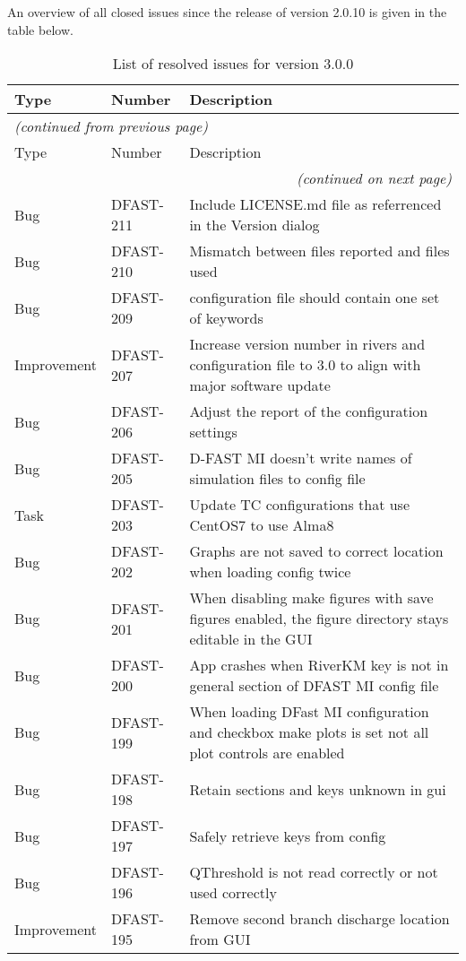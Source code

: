 \documentclass{deltares_memo}
\begin{document}
An overview of all closed issues since the release of version 2.0.10 is given in the table below.

\begin{longtable}{l|l|p{8cm}}
\caption{List of resolved issues for version 3.0.0} \\
Type & Number & Description \\ \hline
\endfirsthead
\multicolumn{3}{l}{\textsl{(continued from previous page)}} \\
Type & Number & Description \\ \hline
\endhead
\hline \multicolumn{3}{r}{\textsl{(continued on next page)}} \\
\endfoot
\endlastfoot
Bug & DFAST-211 & Include LICENSE.md file as referrenced in the Version dialog \\
Bug & DFAST-210 & Mismatch between files reported and files used \\
Bug & DFAST-209 & configuration file should contain one set of keywords \\
Improvement & DFAST-207 & Increase version number in rivers and configuration file to 3.0 to align with major software update \\
Bug & DFAST-206 & Adjust the report of the configuration settings \\
Bug & DFAST-205 & D-FAST MI doesn't write names of simulation files to config file \\
Task & DFAST-203 & Update TC configurations that use CentOS7 to use Alma8 \\
Bug & DFAST-202 & Graphs are not saved to correct location when loading config twice \\
Bug & DFAST-201 & When disabling make figures with save figures enabled, the figure directory stays editable in the GUI \\
Bug & DFAST-200 & App crashes when RiverKM key is not in general section of DFAST MI config file \\
Bug & DFAST-199 & When loading DFast MI configuration and checkbox make plots is set not all plot controls are enabled \\
Bug & DFAST-198 & Retain sections and keys unknown in gui \\
Bug & DFAST-197 & Safely retrieve keys from config \\
Bug & DFAST-196 & QThreshold is not read correctly or not used correctly \\
Improvement & DFAST-195 & Remove second branch discharge location from GUI \\

\end{longtable}
\end{document}
